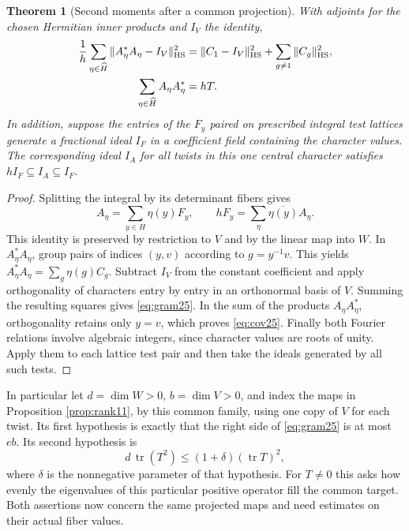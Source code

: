 \documentclass[a4paper,11pt]{article}
\newtheorem{theorem}[proposition]{Theorem}
\theoremstyle{definition}
\theoremstyle{remark}
\numberwithin{equation}{section}
\begin{document}
\begin{theorem}[Second moments after a common projection]\label{thm:gram25}
With adjoints for the chosen Hermitian inner products and \(I_V\) the identity,
\begin{align}
 \frac1h\sum_{\eta\in\widehat H}\|A_\eta^*A_\eta-I_V\|_{\rm HS}^2
    &=\|C_1-I_V\|_{\rm HS}^2+
                     \sum_{g\ne1}\|C_g\|_{\rm HS}^2,\label{eq:gram25}\\
 \sum_{\eta\in\widehat H}A_\eta A_\eta^*&=hT.\label{eq:cov25}
\end{align}
In addition, suppose the entries of the \(F_y\) paired on prescribed integral test lattices generate a fractional ideal \(I_F\) in a coefficient field containing the character values. The corresponding ideal \(I_A\) for all twists in this one central character satisfies \(hI_F\subseteq I_A\subseteq I_F\).
\end{theorem}
\begin{proof}
Splitting the integral by its determinant fibers gives
\[
 A_\eta=\sum_{y\in H}\eta(y)F_y,\qquad
 hF_y=\sum_\eta\overline{\eta(y)}A_\eta.
\]
This identity is preserved by restriction to \(V\) and by the linear map into \(W\). In \(A_\eta^*A_\eta\), group pairs of indices \((y,v)\) according to \(g=y^{-1}v\). This yields \(A_\eta^*A_\eta=\sum_g\eta(g)C_g\). Subtract \(I_V\) from the constant coefficient and apply orthogonality of characters entry by entry in an orthonormal basis of \(V\). Summing the resulting squares gives \eqref{eq:gram25}. In the sum of the products \(A_\eta A_\eta^*\), orthogonality retains only \(y=v\), which proves \eqref{eq:cov25}. Finally both Fourier relations involve algebraic integers, since character values are roots of unity. Apply them to each lattice test pair and then take the ideals generated by all such tests.
\end{proof}

In particular let \(d=\dim W>0\), \(b=\dim V>0\), and index the maps in Proposition \ref{prop:rank11}, by this common family, using one copy of \(V\) for each twist. Its first hypothesis is exactly that the right side of \eqref{eq:gram25} is at most \(eb\). Its second hypothesis is
\[
       d\,\operatorname{tr}(T^2)\le(1+\delta)(\operatorname{tr}T)^2 ,
\]
where \(\delta\) is the nonnegative parameter of that hypothesis. For \(T\ne0\) this asks how evenly the eigenvalues of this particular positive operator fill the common target. Both assertions now concern the same projected maps and need estimates on their actual fiber values.
\end{document}
